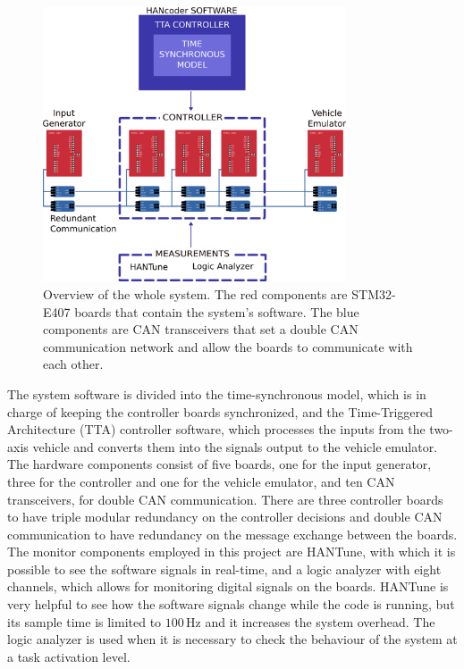 \documentclass[table,xcdraw]{article}
\begin{document}
\begin{figure}[h!]
    \centering
    \includegraphics[width=0.8\textwidth]{figures/methodology/methodology_lowres.png}
    \caption{Overview of the whole system. The red components are STM32-E407 boards that contain the system's software. The blue components are CAN transceivers that set a double CAN communication network and allow the boards to communicate with each other.}
    \label{fig:system_overview}
\end{figure}

The system software is divided into the time-synchronous model, which is in charge of keeping the controller boards synchronized, and the Time-Triggered Architecture (TTA) controller software, which processes the inputs from the two-axis vehicle and converts them into the signals output to the vehicle emulator. The hardware components consist of five boards, one for the input generator, three for the controller and one for the vehicle emulator, and ten CAN transceivers, for double CAN communication. There are three controller boards to have triple modular redundancy on the controller decisions and double CAN communication to have redundancy on the message exchange between the boards. The monitor components employed in this project are HANTune, with which it is possible to see the software signals in real-time, and a logic analyzer with eight channels, which allows for monitoring digital signals on the boards. HANTune is very helpful to see how the software signals change while the code is running, but its sample time is limited to $100\,$Hz and it increases the system overhead. The logic analyzer is used when it is necessary to check the behaviour of the system at a task activation level.\\
\end{document}
